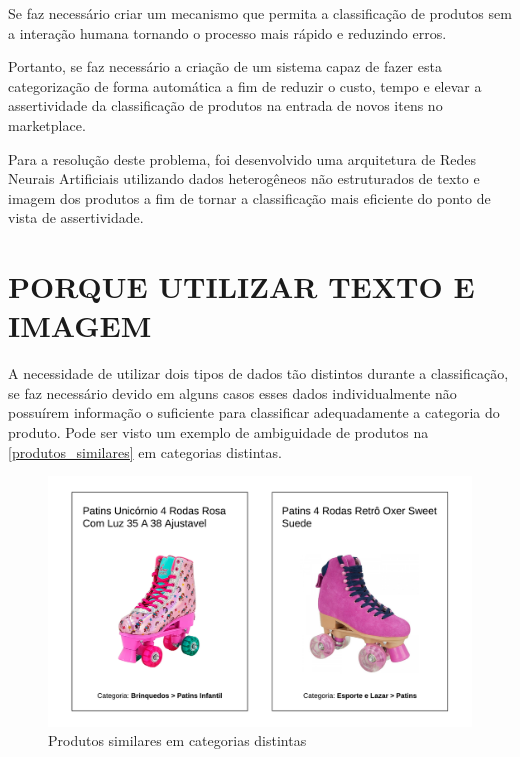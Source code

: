 Se faz necessário criar um mecanismo que permita a classificação de produtos sem a interação humana tornando o processo mais rápido e reduzindo erros.



Portanto, se faz necessário a criação de um sistema capaz de fazer esta categorização de forma automática a fim de reduzir o custo, tempo e elevar a assertividade da classificação de produtos na entrada de novos itens no marketplace. 

Para a resolução deste problema, foi desenvolvido uma arquitetura de Redes Neurais Artificiais utilizando dados heterogêneos não estruturados de texto e imagem dos produtos a fim de tornar a classificação mais eficiente do ponto de vista de assertividade.

\section{PORQUE UTILIZAR TEXTO E IMAGEM}

A necessidade de utilizar dois tipos de dados tão distintos durante a classificação, se faz necessário devido em alguns casos esses dados individualmente não possuírem informação o suficiente para classificar adequadamente a categoria do produto. Pode ser visto um exemplo de ambiguidade de produtos na \autoref{produtos_similares} em categorias distintas.

\begin{figure}[htb]
	\caption{\label{produtos_similares} Produtos similares em categorias distintas}
	\begin{center}
	    \includegraphics[scale=0.5]{artigo/recursos/imagens/produtos-similares.png}
	\end{center}
\end{figure}

